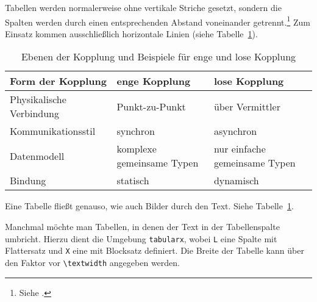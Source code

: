 Tabellen werden normalerweise ohne vertikale Striche gesetzt, sondern die Spalten werden durch einen entsprechenden Abstand voneinander getrennt.\footnote{Siehe \cite[S. 89]{Willberg1999}.} Zum Einsatz kommen ausschließlich horizontale Linien (siehe Tabelle~\ref{Kap2:Kopplungsformen}).

\begin{table}[h]
  \caption{Ebenen der Kopplung und Beispiele für enge und lose Kopplung}
  \label{Kap2:Kopplungsformen}
  \renewcommand{\arraystretch}{1.2}
  \centering
  \sffamily
  \begin{footnotesize}
    \begin{tabular}{l l l}
    \toprule
    \textbf{Form der Kopplung} & \textbf{enge Kopplung} & \textbf{lose Kopplung}\\
    \midrule
    Physikalische Verbindung	&	Punkt-zu-Punkt	& 	über Vermittler\\
    Kommunikationsstil	&	synchron		&	asynchron\\
    Datenmodell	&	komplexe gemeinsame Typen	&	nur einfache gemeinsame Typen\\
    Bindung	&	statisch		&	dynamisch\\
    \bottomrule
    \end{tabular}
  \end{footnotesize}
  \rmfamily
\end{table}

Eine Tabelle fließt genauso, wie auch Bilder durch den Text. Siehe Tabelle~\ref{Kap2:Kopplungsformen}.

Manchmal möchte man Tabellen, in denen der Text in der Tabellenspalte umbricht. Hierzu dient die Umgebung \texttt{tabularx}, wobei \texttt{L} eine Spalte mit Flattersatz und \texttt{X} eine mit Blocksatz definiert. Die Breite der Tabelle kann über den Faktor vor \verb+\textwidth+ angegeben werden.

